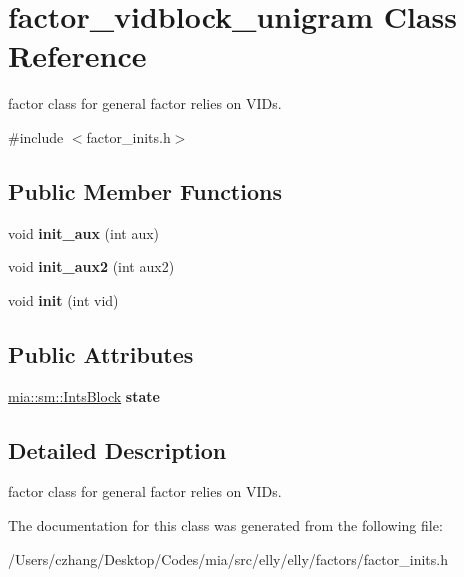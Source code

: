 \hypertarget{classfactor__vidblock__unigram}{\section{factor\-\_\-vidblock\-\_\-unigram Class Reference}
\label{classfactor__vidblock__unigram}
}


factor class for general factor relies on V\-I\-Ds.  




{\ttfamily \#include $<$factor\-\_\-inits.\-h$>$}

\subsection*{Public Member Functions}
\begin{DoxyCompactItemize}
\item 
\hypertarget{classfactor__vidblock__unigram_ae3e9a7998e669a52fd00410e17e87648}{void {\bfseries init\-\_\-aux} (int aux)}\label{classfactor__vidblock__unigram_ae3e9a7998e669a52fd00410e17e87648}

\item 
\hypertarget{classfactor__vidblock__unigram_a076f9e660a6cee29835e428db0f9018e}{void {\bfseries init\-\_\-aux2} (int aux2)}\label{classfactor__vidblock__unigram_a076f9e660a6cee29835e428db0f9018e}

\item 
\hypertarget{classfactor__vidblock__unigram_ae47699589594143684c2e82a0f684fac}{void {\bfseries init} (int vid)}\label{classfactor__vidblock__unigram_ae47699589594143684c2e82a0f684fac}

\end{DoxyCompactItemize}
\subsection*{Public Attributes}
\begin{DoxyCompactItemize}
\item 
\hypertarget{classfactor__vidblock__unigram_a1cb8fe295f7b909b339928272315bea8}{\hyperlink{classmia_1_1sm_1_1_ints_block}{mia\-::sm\-::\-Ints\-Block} {\bfseries state}}\label{classfactor__vidblock__unigram_a1cb8fe295f7b909b339928272315bea8}

\end{DoxyCompactItemize}


\subsection{Detailed Description}
factor class for general factor relies on V\-I\-Ds. 

The documentation for this class was generated from the following file\-:\begin{DoxyCompactItemize}
\item 
/\-Users/czhang/\-Desktop/\-Codes/mia/src/elly/elly/factors/factor\-\_\-inits.\-h\end{DoxyCompactItemize}
